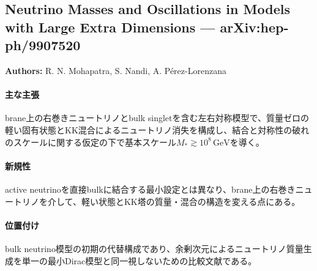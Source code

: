 \subsection{Neutrino Masses and Oscillations in Models with Large Extra Dimensions --- arXiv:hep-ph/9907520}

\textbf{Authors:} R. N. Mohapatra, S. Nandi, A. P\'erez-Lorenzana

\paragraph{主な主張}
brane上の右巻きニュートリノとbulk singletを含む左右対称模型で、質量ゼロの軽い固有状態とKK混合によるニュートリノ消失を構成し、結合と対称性の破れのスケールに関する仮定の下で基本スケール$M_*\gtrsim10^8\,\mathrm{GeV}$を導く\cite{Mohapatra:1999BulkOscillations}。

\paragraph{新規性}
active neutrinoを直接bulkに結合する最小設定とは異なり、brane上の右巻きニュートリノを介して、軽い状態とKK塔の質量・混合の構造を変える点にある。

\paragraph{位置付け}
bulk neutrino模型の初期の代替構成であり、余剰次元によるニュートリノ質量生成を単一の最小Dirac模型と同一視しないための比較文献である。
